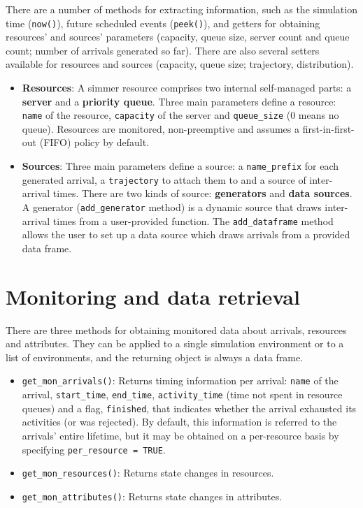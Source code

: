 \documentclass[
]{book}
\providecommand{\tightlist}{%
  \setlength{\itemsep}{0pt}\setlength{\parskip}{0pt}}
\begin{document}
There are a number of methods for extracting information, such as the simulation time (\texttt{now()}), future scheduled events (\texttt{peek()}), and getters for obtaining resources' and sources' parameters (capacity, queue size, server count and queue count; number of arrivals generated so far). There are also several setters available for resources and sources (capacity, queue size; trajectory, distribution).

\begin{itemize}
\item
  \textbf{Resources}: A simmer resource comprises two internal self-managed parts: a \textbf{server} and a \textbf{priority queue}. Three main parameters define a resource: \texttt{name} of the resource, \texttt{capacity} of the server and \texttt{queue\_size} (0 means no queue). Resources are monitored, non-preemptive and assumes a first-in-first-out (FIFO) policy by default.
\item
  \textbf{Sources}: Three main parameters define a source: a \texttt{name\_prefix} for each generated arrival, a \texttt{trajectory} to attach them to and a source of inter-arrival times. There are two kinds of source: \textbf{generators} and \textbf{data sources}. A generator (\texttt{add\_generator} method) is a dynamic source that draws inter-arrival times from a user-provided function. The \texttt{add\_dataframe} method allows the user to set up a data source which draws arrivals from a provided data frame.
\end{itemize}

\hypertarget{monitoring-and-data-retrieval}{%
\section{Monitoring and data retrieval}\label{monitoring-and-data-retrieval}}

There are three methods for obtaining monitored data about arrivals, resources and attributes. They can be applied to a single simulation environment or to a list of environments, and the returning object is always a data frame.

\begin{itemize}
\tightlist
\item
  \texttt{get\_mon\_arrivals()}: Returns timing information per arrival: \texttt{name} of the arrival, \texttt{start\_time}, \texttt{end\_time}, \texttt{activity\_time} (time not spent in resource queues) and a flag, \texttt{finished}, that indicates whether the arrival exhausted its activities (or was rejected). By default, this information is referred to the arrivals' entire lifetime, but it may be obtained on a per-resource basis by specifying \texttt{per\_resource\ =\ TRUE}.
\item
  \texttt{get\_mon\_resources()}: Returns state changes in resources.
\item
  \texttt{get\_mon\_attributes()}: Returns state changes in attributes.
\end{itemize}
\end{document}

